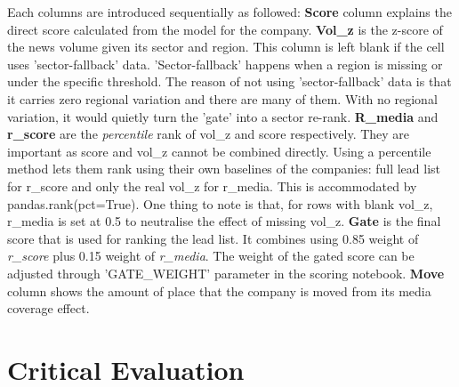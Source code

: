 \documentclass[ %
                    author={Natchalin Iwsakul \\[0.4em] Inkaphol Siriwongwattana \\[0.4em] Tanaphan Kummaraphat \\[0.6em] Patorn Srisupap},,
                supervisor={Fernando Moreno-Pino},
                    degree={MSc},
                     title={Propensity Modelling for SME Commercial Lending Using Open Public Data
},
                  subtitle={Companies House and GDELT as predictors of first-time borrowing},
                      type={},
                      year={2026}]{dissertation}
\begin{document}
Each columns are introduced sequentially as followed:
\textbf{Score} column explains the direct score calculated from the model for the company.
\textbf{Vol\_z} is the z-score of the news volume given its sector and region. This column is left blank if the cell uses 'sector-fallback' data. 'Sector-fallback' happens when a region is missing or under the specific threshold. The reason of not using 'sector-fallback' data is that it carries zero regional variation and there are many of them. With no regional variation, it would quietly turn the 'gate' into a sector re-rank.
\textbf{R\_media} and \textbf{r\_score} are the \textit{percentile} rank of vol\_z and score respectively. They are important as score and vol\_z cannot be combined directly. Using a percentile method lets them rank using their own baselines of the companies: full lead list for r\_score and only the real vol\_z for r\_media. This is accommodated by pandas.rank(pct=True). One thing to note is that, for rows with blank vol\_z, r\_media is set at 0.5 to neutralise the effect of missing vol\_z.
\textbf{Gate} is the final score that is used for ranking the lead list. It combines using 0.85 weight of \textit{r\_score} plus 0.15 weight of \textit{r\_media}. The weight of the gated score can be adjusted through 'GATE\_WEIGHT' parameter in the scoring notebook. 
\textbf{Move} column shows the amount of place that the company is moved from its media coverage effect.




\chapter{Critical Evaluation}
\label{chap:evaluation}


\end{document}
